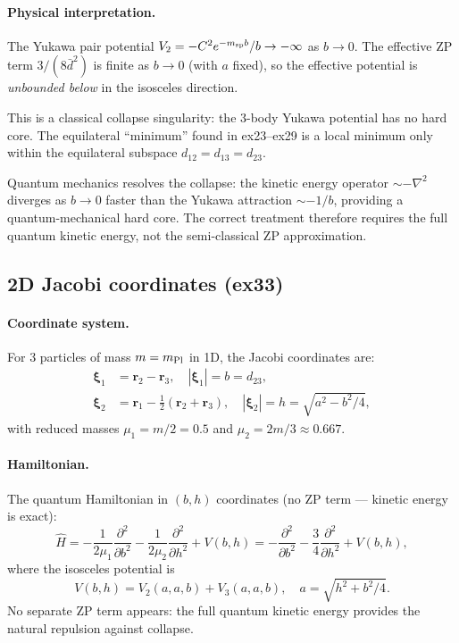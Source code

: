 \paragraph{Physical interpretation.}
The Yukawa pair potential $V_2 = -C^2 e^{-m_{\rm sp}b}/b \to -\infty$ as $b\to0$.
The effective ZP term $3/(8\bar{d}^2)$ is finite as $b\to0$ (with $a$ fixed),
so the effective potential is \emph{unbounded below} in the isosceles direction.

This is a classical collapse singularity: the 3-body Yukawa potential has no
hard core. The equilateral ``minimum'' found in ex23--ex29 is a local minimum
only within the equilateral subspace $d_{12}=d_{13}=d_{23}$.

Quantum mechanics resolves the collapse: the kinetic energy operator
$\sim -\nabla^2$ diverges as $b\to0$ faster than the Yukawa attraction
$\sim -1/b$, providing a quantum-mechanical hard core.
The correct treatment therefore requires the full quantum kinetic energy,
not the semi-classical ZP approximation.

\subsection{2D Jacobi coordinates (ex33)}

\paragraph{Coordinate system.}
For 3 particles of mass $m=m_{\rm Pl}$ in 1D, the Jacobi coordinates are:
\begin{align}
  \boldsymbol{\xi}_1 &= \mathbf{r}_2 - \mathbf{r}_3, \quad
    |\boldsymbol{\xi}_1| = b = d_{23},\\
  \boldsymbol{\xi}_2 &= \mathbf{r}_1 - \tfrac{1}{2}(\mathbf{r}_2+\mathbf{r}_3),\quad
    |\boldsymbol{\xi}_2| = h = \sqrt{a^2 - b^2/4},
\end{align}
with reduced masses $\mu_1 = m/2 = 0.5$ and $\mu_2 = 2m/3 \approx 0.667$.

\paragraph{Hamiltonian.}
The quantum Hamiltonian in $(b,h)$ coordinates (no ZP term — kinetic energy
is exact):
\begin{equation}
  \hat{H} = -\frac{1}{2\mu_1}\frac{\partial^2}{\partial b^2}
            -\frac{1}{2\mu_2}\frac{\partial^2}{\partial h^2}
            + V(b,h)
  = -\frac{\partial^2}{\partial b^2}
    -\frac{3}{4}\frac{\partial^2}{\partial h^2}
    + V(b,h),
\end{equation}
where the isosceles potential is
\begin{equation}
  V(b,h) = V_2\!\left(a,a,b\right) + V_3\!\left(a,a,b\right),
  \quad a = \sqrt{h^2 + b^2/4}.
\end{equation}
No separate ZP term appears: the full quantum kinetic energy provides
the natural repulsion against collapse.

